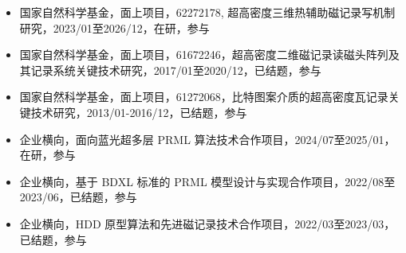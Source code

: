 \documentclass[zh]{resume}
\begin{document}
\begin{itemize}
  \item 国家自然科学基金，面上项目，62272178, 超高密度三维热辅助磁记录写机制研究，2023/01至2026/12，在研，参与
  \item 国家自然科学基金，面上项目，61672246，超高密度二维磁记录读磁头阵列及其记录系统关键技术研究，2017/01至2020/12，已结题，参与
  \item 国家自然科学基金，面上项目，61272068，比特图案介质的超高密度瓦记录关键技术研究，2013/01-2016/12，已结题，参与
  \item 企业横向，面向蓝光超多层 PRML 算法技术合作项目，2024/07至2025/01，在研，参与
  \item 企业横向，基于 BDXL 标准的 PRML 模型设计与实现合作项目，2022/08至2023/06，已结题，参与
  \item 企业横向，HDD 原型算法和先进磁记录技术合作项目，2022/03至2023/03，已结题，参与
\end{itemize}


\onehalfspacing\hspace{2em}%
\nocite{*}
\printbibliography[heading=bibliography,title=参考文献]
\par
\end{document}
